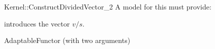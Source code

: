 \begin{ccRefFunctionObjectConcept}{Kernel::ConstructDividedVector_2}
A model for this must provide:




            {introduces the vector $v/s$.}


\ccRefines
AdaptableFunctor (with two arguments)

\ccSeeAlso
{}\\

\end{ccRefFunctionObjectConcept}
